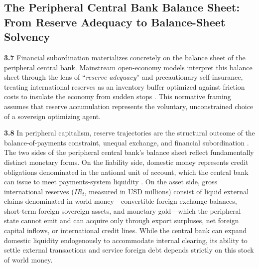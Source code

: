 \subsection{The Peripheral Central Bank Balance Sheet: From Reserve Adequacy to Balance-Sheet Solvency}
\label{sec:B3_levr}

\textbf{3.7} Financial subordination materializes concretely on the balance sheet of the peripheral central bank. Mainstream open-economy models interpret this balance sheet through the lens of ``\textit{reserve adequacy}'' and precautionary self-insurance, treating international reserves as an inventory buffer optimized against friction costs to insulate the economy from sudden stops \citep{Jeanne2007,CespedesChang2024}. This normative framing assumes that reserve accumulation represents the voluntary, unconstrained choice of a sovereign optimizing agent.

\textbf{3.8} In peripheral capitalism, reserve trajectories are the structural outcome of the balance-of-payments constraint, unequal exchange, and financial subordination \citep{Vasudevan2009,Abeles2013}. The two sides of the peripheral central bank's balance sheet reflect fundamentally distinct monetary forms. On the liability side, domestic money represents credit obligations denominated in the national unit of account, which the central bank can issue to meet payments-system liquidity \citep[\S3.2.3]{Basu2022}. On the asset side, gross international reserves ($IR_t$, measured in USD millions) consist of liquid external claims denominated in world money---convertible foreign exchange balances, short-term foreign sovereign assets, and monetary gold---which the peripheral state cannot emit and can acquire only through export surpluses, net foreign capital inflows, or international credit lines. While the central bank can expand domestic liquidity endogenously to accommodate internal clearing, its ability to settle external transactions and service foreign debt depends strictly on this stock of world money. 

